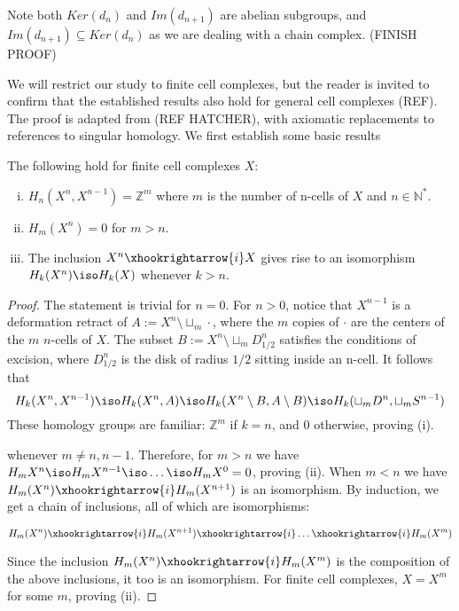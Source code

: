 \begin{remark}
Note both $Ker(d_n)$ and $Im(d_{n+1})$ are abelian subgroups, and $Im(d_{n+1}) \subseteq Ker(d_n)$ as we are dealing with a chain complex. (FINISH PROOF)
\end{remark}

We will restrict our study to finite cell complexes, but the reader is invited to confirm that the established results also hold for general cell complexes (REF). The proof is adapted from (REF HATCHER), with axiomatic replacements to references to singular homology. We first establish some basic results

\begin{lemma}\label{cell-lemma}
The following hold for finite cell complexes $X$:
\begin{enumerate}[(i)]
\item $H_n(X^n,X^{n-1})=\mathbb{Z}^m$ where $m$ is the number of n-cells of $X$ and $n\in \mathbb{N}^*$.
\item $H_m(X^n)=0$ for $m>n$.
\item The inclusion $X^n\xhookrightarrow{i} X$ gives rise to an isomorphism $H_k(X^n)\iso H_k(X)$ whenever $k>n$.
\end{enumerate}
\end{lemma}

\begin{proof}
The statement is trivial for $n=0$. For $n>0$, notice that $X^{n-1}$ is a deformation retract of $A:=X^{n}\setminus \sqcup_m \cdot$, where the $m$ copies of $\cdot$ are the centers of the $m$ $n$-cells of $X$. The subset $B:= X^{n}\setminus \sqcup_m D_{1/2}^n$ satisfies the conditions of excision, where $D_{1/2}^n$ is the disk of radius $1/2$ sitting inside an n-cell.
It follows that
$$H_k(X^n,X^{n-1})\iso H_k(X^n,A)\iso H_k(X^n\setminus B,A\setminus B)\iso H_k(\sqcup_m D^n,\sqcup_m S^{n-1})$$
These homology groups are familiar: $\mathbb{Z}^m$ if $k=n$, and $0$ otherwise, proving (i).

whenever $m\neq n,n-1$. Therefore, for $m>n$ we have $H_m{X^n}\iso H_m{X^{n-1}}\iso \dots \iso H_m{X^0}=0$, proving (ii). When $m<n$ we have $H_m(X^n)\xhookrightarrow{i} H_m(X^{n+1})$ is an isomorphism. By induction, we get a chain of inclusions, all of which are isomorphisms:

$$H_m(X^n)\xhookrightarrow{i} H_m(X^{n+1})\xhookrightarrow{i}\dots \xhookrightarrow{i} H_m(X^{m})$$

Since the inclusion $H_m(X^n)\xhookrightarrow{i} H_m(X^{m})$ is the composition of the above inclusions, it too is an isomorphism. For finite cell complexes, $X=X^m$ for some $m$, proving (ii). 
\end{proof}

